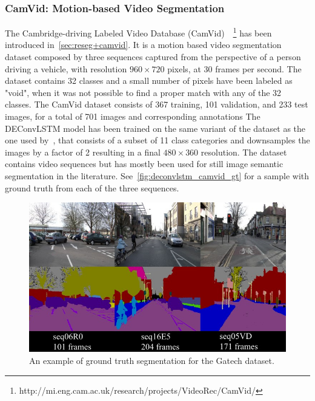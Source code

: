 \subsubsection{CamVid: Motion-based Video Segmentation}
\label{sec:deconvLSTM_camvid}
The Cambridge-driving Labeled Video Database (CamVid)~\citep{
Brostow2010semantic}~\footnote{%
http://mi.eng.cam.ac.uk/research/projects/VideoRec/CamVid/}
has been introduced in~\autoref{sec:reseg+camvid}. It is a motion based video
segmentation dataset composed by three sequences captured from the perspective
of a person driving a vehicle, with resolution $960 \times 720$ pixels, at 30
frames per second. The dataset contains 32 classes and a small number of pixels
have been labeled as "void", when it was not possible to find a proper match
with any of the 32 classes. The CamVid dataset consists of 367 training, 101
validation, and 233 test images, for a total of 701 images and corresponding
annotations The DEConvLSTM model has been trained on the same variant of the
dataset as the one used by~\cite{badrinarayanan2015segnet}, that consists of a
subset of 11 class categories and downsamples the images by a factor of 2
resulting in a final $480 \times 360$ resolution. The dataset contains video
sequences but has mostly been used for still image semantic segmentation in the
literature. See~\autoref{fig:deconvlstm_camvid_gt} for a sample with ground
truth from each of the three sequences.

\begin{figure}[t]
    \centering
    \includegraphics[width=0.8\columnwidth]{img/deconvLSTM/camvid_gt.jpg}
    \caption{An example of ground truth segmentation for the Gatech dataset.}
    \label{fig:deconvlstm_camvid_gt}
\end{figure}



